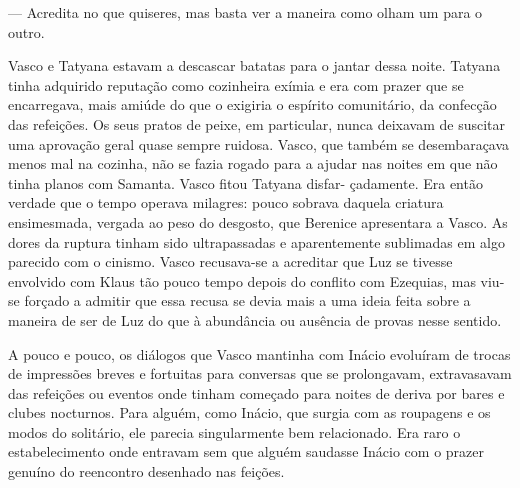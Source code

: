 --- Acredita no que quiseres, mas basta ver a maneira como olham um para o
  outro.


Vasco e Tatyana estavam a descascar batatas para o jantar dessa noite.
Tatyana tinha adquirido reputação como cozinheira exímia e era com
prazer que se encarregava, mais amiúde do que o exigiria o espírito
comunitário, da confecção das refeições. Os seus pratos de peixe, em
particular, nunca deixavam de suscitar uma aprovação geral quase sempre
ruidosa. Vasco, que também se desembaraçava menos mal na cozinha, não
se fazia rogado para a ajudar nas noites em que não tinha planos com
Samanta. Vasco fitou Tatyana disfar- çadamente. Era então verdade que o
tempo operava milagres: pouco sobrava daquela criatura ensimesmada,
vergada ao peso do desgosto, que Berenice apresentara a Vasco. As dores
da ruptura tinham sido ultrapassadas e aparentemente sublimadas em
algo parecido com o cinismo. Vasco recusava-se a acreditar que Luz se
tivesse envolvido com Klaus tão pouco tempo depois do conflito com
Ezequias, mas viu-se forçado a admitir que essa recusa se devia mais a
uma ideia feita sobre a maneira de ser de Luz do que à abundância ou
ausência de provas nesse sentido.

A pouco e pouco, os diálogos que Vasco mantinha com Inácio evoluíram de
trocas de impressões breves e fortuitas para conversas que se
prolongavam, extravasavam das refeições ou eventos onde tinham começado
para noites de deriva por bares e clubes nocturnos. Para alguém, como
Inácio, que surgia com as roupagens e os modos do solitário, ele parecia
singularmente bem relacionado. Era raro o estabelecimento onde entravam
sem que alguém saudasse Inácio com o prazer genuíno do reencontro
desenhado nas feições.

